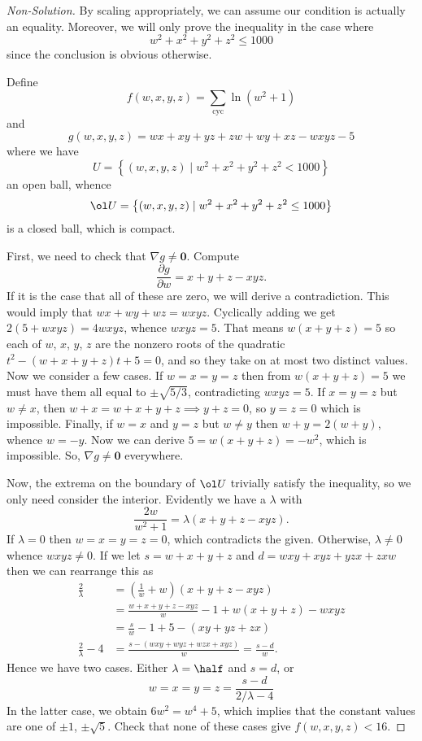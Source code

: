 \documentclass[11pt]{scrartcl}
\begin{document}
\begin{proof}[Non-Solution]
  By scaling appropriately, we can assume our condition is actually an equality.
  Moreover, we will only prove the inequality in the case where
  \[ w^2+x^2+y^2+z^2 \le 1000 \]
  since the conclusion is obvious otherwise.

  Define
  \[ f(w,x,y,z) = \sum_{\text{cyc}} \ln (w^2+1) \]
  and
  \[ g(w,x,y,z) = wx+xy+yz+zw+wy+xz-wxyz-5 \]
  where we have
  \[ U = \left\{ (w,x,y,z) \mid w^2+x^2+y^2+z^2 < 1000 \right\} \]
  an open ball, whence
  \[ \ol U = \left\{ (w,x,y,z) \mid w^2+x^2+y^2+z^2 \le 1000 \right\} \]
  is a closed ball, which is compact.

  First, we need to check that $\nabla g \neq \mathbf{0}$. Compute
  \[ \frac{\partial g}{\partial w} = x+y+z - xyz. \]
  If it is the case that all of these are zero, we will derive a contradiction.
  This would imply that $wx+wy+wz = wxyz$.
  Cyclically adding we get $2(5+wxyz) = 4wxyz$, whence $wxyz = 5$.
  That means $w(x+y+z) = 5$
  so each of $w$, $x$, $y$, $z$ are the nonzero roots of the quadratic $t^2-(w+x+y+z)t+5 = 0$,
  and so they take on at most two distinct values.
  Now we consider a few cases. If $w=x=y=z$ then from $w(x+y+z) = 5$
  we must have them all equal to $\pm \sqrt{5/3}$, contradicting $wxyz=5$.
  If $x=y=z$ but $w \neq x$, then $w+x=w+x+y+z \implies y+z = 0$, so $y=z=0$ which is impossible.
  Finally, if $w=x$ and $y=z$ but $w \neq y$ then $w+y=2(w+y)$, whence $w=-y$.
  Now we can derive $5=w(x+y+z)=-w^2$, which is impossible.
  So, $\nabla g \neq \mathbf{0}$ everywhere.

  Now, the extrema on the boundary of $\ol U$ trivially satisfy the inequality,
  so we only need consider the interior.
  Evidently we have a $\lambda$ with
  \[ \frac{2w}{w^2+1} = \lambda (x+y+z-xyz). \]
  If $\lambda = 0$ then $w=x=y=z=0$, which contradicts the given.
  Otherwise, $\lambda \neq 0$ whence $wxyz \neq 0$.
  If we let $s = w+x+y+z$ and $d = wxy+xyz+yzx+zxw$ then we can rearrange this as
  \begin{align*}
    \frac{2}{\lambda} &= \left( \frac 1w+w \right)(x+y+z-xyz) \\
    &= \frac{w+x+y+z-xyz}{w}-1 + w(x+y+z) - wxyz \\
    &= \frac{s}{w} - 1 + 5-(xy+yz+zx) \\
    \frac{2}{\lambda}-4 &= \frac{s - (wxy+wyz+wzx+xyz)}{w} = \frac{s-d}{w}.
  \end{align*}
  Hence we have two cases. Either $\lambda = \half$ and $s = d$, or
  \[ w = x = y = z = \frac{s-d}{2/\lambda - 4} \]
  In the latter case, we obtain $6w^2 = w^4+5$,
  which implies that the constant values are one of $\pm 1$, $\pm \sqrt{5}$.
  Check that none of these cases give $f(w,x,y,z) < 16$.


\end{proof}
\end{document}
